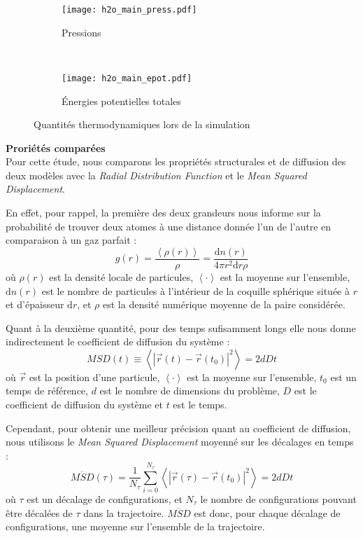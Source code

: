 \begin{figure}[h!]
    \centering
    \begin{subfigure}{.49\textwidth}
        \texttt{[image: h2o\_main\_press.pdf]}
        \caption{Pressions}
    \end{subfigure}%
    ~
    \begin{subfigure}{.49\textwidth}
        \texttt{[image: h2o\_main\_epot.pdf]}
        \caption{Énergies potentielles totales}
    \end{subfigure}
    \caption{Quantités thermodynamiques lors de la simulation}
    \label{fig:h2o_main}
\end{figure}

\textbf{Proriétés comparées}\\
Pour cette étude, nous comparons les propriétés structurales et de diffusion des deux modèles avec la \emph{Radial Distribution Function} et le \emph{Mean Squared Displacement}.

En effet, pour rappel, la première des deux grandeurs nous informe sur la probabilité de trouver deux atomes à une distance donnée l'un de l'autre en comparaison à un gaz parfait :
\begin{equation}
    \boxed%
    {
        g (r) = \frac{\left\langle \rho (r) \right\rangle}{\rho} = \frac{\mathrm{d}n(r)}{4 \pi r^2 \mathrm{d}r \rho}
    }
    \label{eq:rdf}
\end{equation}
où $\rho (r)$ est la densité locale de particules, $\left\langle \cdot \right\rangle$ est la moyenne sur l'ensemble, $\mathrm{d}n(r)$ est le nombre de particules à l'intérieur de la coquille sphérique située à $r$ et d'épaisseur $\mathrm{d}r$, et $\rho$ est la densité numérique moyenne de la paire considérée.

Quant à la deuxième quantité, pour des temps sufisamment longs elle nous donne indirectement le coefficient de diffusion du système :
\begin{equation*}
    MSD(t) \equiv \left\langle \left| \vec{r}(t) - \vec{r}(t_0) \right|^2 \right\rangle = 2 d D t
\end{equation*}
où $\vec{r}$ est la position d'une particule, $\left\langle \cdot \right\rangle$ est la moyenne sur l'ensemble, $t_0$ est un temps de référence, $d$ est le nombre de dimensions du problème, $D$ est le coefficient de diffusion du système et $t$ est le temps.

Cependant, pour obtenir une meilleur précision quant au coefficient de diffusion, nous utilisons le \emph{Mean Squared Displacement} moyenné sur les décalages en temps :
\begin{equation}
    \boxed%
    {
        \overline{MSD} (\tau) = \frac{1}{N_{\tau}} \sum_{i = 0}^{N_{\tau}} \left\langle \left| \vec{r}(\tau) - \vec{r}(t_0) \right|^2 \right\rangle  = 2 d D t
    }
\end{equation}
où $\tau$ est un décalage de configurations, et $N_{\tau}$ le nombre de configurations pouvant être décalées de $\tau$ dans la trajectoire. $\overline{MSD}$ est donc, pour chaque décalage de configurations, une moyenne sur l'ensemble de la trajectoire.

